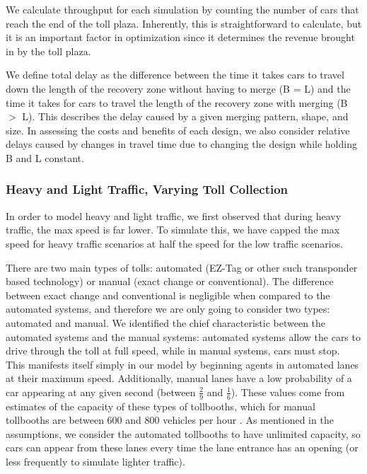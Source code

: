 \documentclass[a4paper, 11pt]{article}
\begin{document}
We calculate throughput for each simulation by counting the number of cars that reach the end of the toll plaza. Inherently, this is straightforward to calculate, but it is an important factor in optimization since it determines the revenue brought in by the toll plaza. 

We define total delay as the difference between the time it takes cars to travel down the length of the recovery zone without having to merge (B = L) and the time it takes for cars to travel the length of the recovery zone with merging (B $>$ L). This describes the delay caused by a given merging pattern, shape, and size. 
In assessing the costs and benefits of each design, we also consider relative delays caused by changes in travel time due to changing the design while holding B and L constant. 




\subsubsection{Heavy and Light Traffic, Varying Toll Collection}

In order to model heavy and light traffic, we first observed that during heavy traffic, the max speed is far lower. To simulate this, we have capped the max speed for heavy traffic scenarios at half the speed for the low traffic scenarios. 

There are two main types of tolls:
automated (EZ-Tag or other such transponder based technology) or manual (exact change or conventional). The difference between exact change and conventional is negligible when compared to the automated systems, and therefore we are only going to consider two types: automated and manual. We identified the chief characteristic between the automated systems and the manual systems: automated systems allow the cars to drive through the toll at full speed, while in manual systems, cars must stop. This manifests itself simply in our model by beginning agents in automated lanes at their maximum speed.
Additionally, manual lanes have a low probability of a car appearing at any given second (between $\frac29$ and $\frac16$). These values come from estimates of the capacity of these types of tollbooths, which for manual tollbooths are between 600 and 800 vehicles per hour \cite{EconomicEvaluation}. As mentioned in the assumptions, we consider the automated tollbooths to have unlimited capacity, so cars can appear from these lanes every time the lane entrance has an opening (or less frequently to simulate lighter traffic). 
\end{document}
